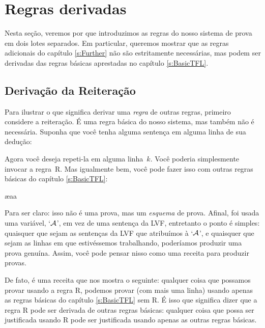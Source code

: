 
\chapter{Regras derivadas}\label{s:Derived}
Nesta se\c c\~ao, veremos por que introduzimos as regras do nosso sistema de prova em dois lotes separados. Em particular, queremos mostrar que as regras adicionais do cap\'itulo \ref{s:Further} n\~ao s\~ao estritamente necess\'arias, mas podem ser derivadas das regras b\'asicas aprestadas no cap\'itulo \ref{s:BasicTFL}. 

\section{Deriva\c c\~ao da Reitera\c c\~ao}
Para ilustrar o que significa derivar uma   \emph{regra} de outras regras, primeiro considere a reitera\c c\~ao. \'E uma regra b\'asica do nosso sistema, mas tamb\'em n\~ao \'e necess\'aria. Suponha que voc\^e tenha alguma senten\c ca em alguma linha de sua dedu\c c\~ao:
\begin{fitchproof}
\end{fitchproof}
Agora voc\^e deseja repeti-la em alguma linha~$k$. Voc\^e poderia simplesmente invocar a regra~R. Mas igualmente bem, voc\^e pode fazer isso com outras regras b\'asicas do cap\'itulo \ref{s:BasicTFL}:
\begin{fitchproof}
	\ae{aa}
\end{fitchproof}


Para ser claro: isso n\~ao \'e uma prova, mas um \emph{esquema} de prova. Afinal, foi usada  uma vari\'avel, `$\mathcal{A}$',  em vez de uma senten\c ca da LVF, entretanto o ponto \'e simples: quaisquer que sejam as senten\c cas da LVF que atribu\'imos \`a `$\mathcal{A}$', e quaisquer que sejam as linhas em que estiv\'essemos trabalhando, poder\'iamos produzir uma  prova genu\'ina. Assim, voc\^e pode pensar nisso como uma receita para produzir provas.

De fato, \'e uma receita que nos mostra o seguinte: qualquer coisa que possamos provar usando a regra R, podemos provar (com mais uma linha) usando apenas as regras b\'asicas do cap\'itulo \ref{s:BasicTFL} sem R. \'E isso que significa dizer que a regra R pode ser derivada de outras regras b\'asicas: qualquer coisa que possa ser justificada usando R pode ser justificada usando apenas as outras regras b\'asicas.

